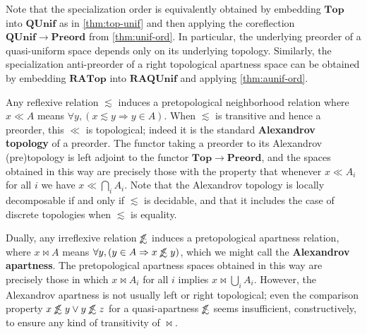 \documentclass{article}
\def\oapt{\mathrel{\!\not\,\not\lesssim}}
\def\leapx{\lesssim}
\let\implies\Rightarrow
\def\inv{^{-1}}
\def\Preord{\mathbf{Preord}}
\def\Top{\mathbf{Top}}
\def\RATop{\mathbf{RATop}}
\def\QUnif{\mathbf{QUnif}}
\def\RAQUnif{\mathbf{RAQUnif}}
\begin{document}
Note that the specialization order is equivalently obtained by embedding $\Top$ into $\QUnif$ as in \cref{thm:top-unif} and then applying the coreflection $\QUnif \to \Preord$ from \cref{thm:unif-ord}.
In particular, the underlying preorder of a quasi-uniform space depends only on its underlying topology.
Similarly, the specialization anti-preorder of a right topological apartness space can be obtained by embedding $\RATop$ into $\RAQUnif$ and applying \cref{thm:aunif-ord}.

\begin{eg}\label{eg:alexandrov}
  Any reflexive relation $\leapx$ induces a pretopological neighborhood relation where $x\ll A$ means $\forall y, (x\leapx y \implies y\in A)$.
  When $\leapx$ is transitive and hence a preorder, this $\ll$ is topological; indeed it is the standard \textbf{Alexandrov topology} of a preorder.
  The functor taking a preorder to its Alexandrov (pre)topology is left adjoint to the functor $\Top \to \Preord$, and the spaces obtained in this way are precisely those with the property that whenever $x\ll A_i$ for all $i$ we have $x\ll \bigcap_i A_i$.
  Note that the Alexandrov topology is locally decomposable if and only if $\leapx$ is decidable, and that it includes the case of discrete topologies when $\leapx$ is equality.
  


  Dually, any irreflexive relation $\oapt$ induces a pretopological apartness relation, where $x\bowtie A$ means $\forall y, (y\in A \implies x\oapt y)$, which we might call the \textbf{Alexandrov apartness}.
  The pretopological apartness spaces obtained in this way are precisely those in which $x\bowtie A_i$ for all $i$ implies $x\bowtie \bigcup_i A_i$.
  However, the Alexandrov apartness is not usually left or right topological; even the comparison property $x\oapt y \lor y\oapt z$ for a quasi-apartness $\oapt$ seems insufficient, constructively, to ensure any kind of transitivity of $\bowtie$.
\end{eg}
\end{document}
